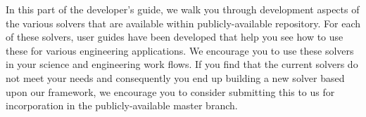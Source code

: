 
In this part of the developer's guide, we walk you through development
aspects of the various solvers that are available within
publicly-available \nek repository.  For each of these solvers, user
guides have been developed that help you see how to use these for
various engineering applications.  We encourage you to use these
solvers in your science and engineering work flows.  If you find that
the current solvers do not meet your needs and consequently you end up
building a new solver based upon our framework, we encourage you to
consider submitting this to us for incorporation in the
publicly-available master branch.





